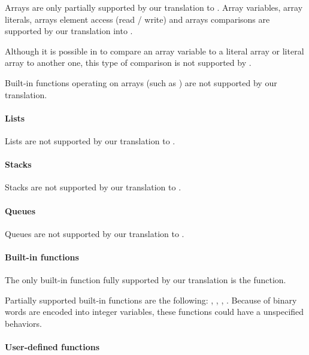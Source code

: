 Arrays are only partially supported by our translation to \uppaal{}.
%
Array variables, array literals, arrays element access (read / write) and arrays comparisons are supported by our translation into \uppaal{}.

\begin{becareful}
	Although it is possible in \imitator{} to compare an array variable to a literal array or literal array to another one, this type of comparison is not supported by \uppaal{}.
\end{becareful}

\begin{becareful}
	Built-in functions operating on arrays (such as ) are not supported by our translation.
\end{becareful}

\paragraph{Lists}

Lists are not supported by our translation to \uppaal{}.

\paragraph{Stacks}

Stacks are not supported by our translation to \uppaal{}.

\paragraph{Queues}

Queues are not supported by our translation to \uppaal{}.


\paragraph{Built-in functions}

The only \imitator{} built-in function fully supported by our translation is the  function.

Partially supported \imitator{} built-in functions are the following: , , , .
Because of binary words are encoded into integer variables, these functions could have a unspecified behaviors.

\paragraph{User-defined functions}

